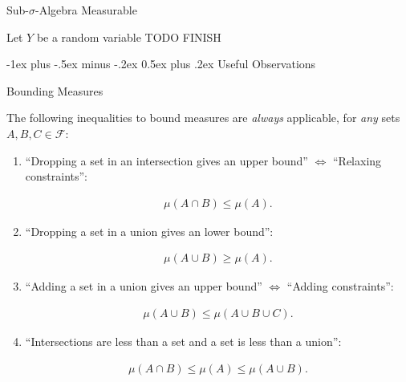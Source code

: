 \documentclass[10pt,landscape]{article}
\makeatletter
\renewcommand{\leq}{\leqslant}
\renewcommand{\geq}{\geqslant}
\newcommand{\CalF}{\mathcal{F}}
\renewcommand{\section}{\@startsection{section}{1}{0mm}%
                                {-1ex plus -.5ex minus -.2ex}%
                                {0.5ex plus .2ex}%
                                {\normalfont\large\bfseries}}
\makeatother
\begin{document}
\begin{multicols}{3}
\begin{definition}{}{Sub-$\sigma$-Algebra Measurable}

    Let $Y$ be a random variable TODO FINISH

\end{definition}


\section{Useful Observations}

\begin{observation}{}{Bounding Measures}

    The following inequalities to bound measures are \emph{always} applicable, for \emph{any} sets $A, B, C \in \CalF$:

    \begin{enumerate}
        \item ``Dropping a set in an intersection gives an upper bound'' $\Leftrightarrow$ ``Relaxing constraints'':

            \begin{align*}
                \mu(A \cap B) \leq \mu(A).
            \end{align*}
        \item ``Dropping a set in a union gives an lower bound'':

            \begin{align*}
                \mu(A \cup B) \geq \mu(A).
            \end{align*}
        \item ``Adding a set in a union gives an upper bound'' $\Leftrightarrow$ ``Adding constraints'':

            \begin{align*}
                \mu(A \cup B) \leq \mu(A \cup B \cup C).
            \end{align*}
        \item ``Intersections are less than a set and a set is less than a union'':

            \begin{align*}
                \mu(A \cap B) \leq \mu(A) \leq \mu(A \cup B).
            \end{align*}
    \end{enumerate}

\end{observation}


\end{multicols}
\end{document}
